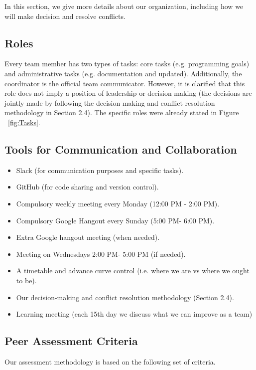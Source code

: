 In this section, we give more details about our organization, including how we will make decision and resolve conflicts. 

\subsection{Roles}

Every team member has two types of tasks: core tasks (e.g. programming goals) and administrative tasks (e.g. documentation and updated). Additionally, the coordinator is the official team communicator. However, it is clarified that this role does not imply a position of leadership or decision making (the decisions are jointly made by following the decision making and conflict resolution methodology in Section 2.4). The specific roles were already stated in Figure ~\ref{fig:Tasks}.

\subsection{Tools for Communication and Collaboration}

\begin{itemize}
	\item Slack (for communication purposes and specific tasks).
	\item GitHub (for code sharing and version control).
	\item Compulsory weekly meeting every Monday (12:00 PM - 2:00 PM).
	\item Compulsory Google Hangout every Sunday (5:00 PM- 6:00 PM).
	\item Extra Google hangout meeting (when needed).
	\item Meeting on Wednesdays 2:00 PM- 5:00 PM (if needed). 
	\item A timetable and advance curve control (i.e. where we are vs where we ought to be).
	\item Our decision-making and conflict resolution methodology (Section 2.4).
	\item Learning meeting (each 15th day we discuss what we can improve as a team)
\end{itemize}




\subsection{Peer Assessment Criteria}

Our assessment methodology is based on the following set of criteria.

